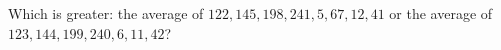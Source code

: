 Which is greater: the average of $122,145,198,241,5,67,12,41$ or the average of $123,144,199,240,6,11,42$?
